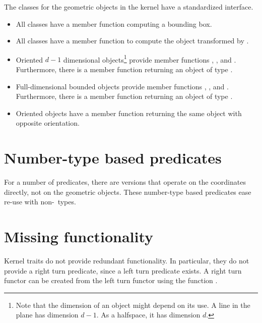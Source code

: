 The classes for the geometric objects in the kernel have a 
standardized interface.%
\begin{itemize}
\item
All classes have a  member function computing a bounding box.
\item
All classes have a  member function
to compute the object transformed by .%
\item
Oriented $d-1$ dimensional objects\footnote{Note that the dimension
of an object might depend on its use. A line in the plane has dimension
$d-1$. As a halfspace, it has dimension $d$.} provide member functions
%
, %
, 
and %
. Furthermore, there is a member
function %
 returning an object of type
.
\item
Full-dimensional bounded objects provide member functions
%
, %
, 
and %
. Furthermore, there is a member
function %
 returning an object of type
.
\item
Oriented objects have a member function %
 returning
the same object with opposite orientation.
\end{itemize}


\section{Number-type based predicates}
For a number of predicates, there are versions that operate on
the coordinates directly, not on the geometric objects. These
number-type based predicates ease re-use with non-\cgal\ types.

\section{Missing functionality\label{sec:NewKernelTraits}}
 Kernel traits do not provide
redundant functionality. In particular, they do not provide a right
turn predicate, since a left turn predicate exists. A right turn
functor can be created from the left turn functor using the function
.

